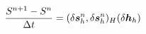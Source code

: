 \documentclass[preview]{standalone}
\newcommand{\dbh}{\delta\boldsymbol{h}_h}
\newcommand{\dbs}{\delta\boldsymbol{s}_h}
\begin{document}
\begin{align*}
\special{dvisvgm:raw <g id='unique000'>}\frac{S^{n+1}-S^n}{\Delta t}=(\dbs^n,\dbs^n)_H(\dbh)\special{dvisvgm:raw </g>}
\end{align*}
\end{document}
